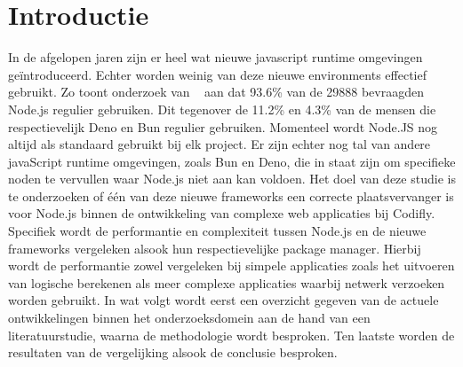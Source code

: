 
\section{Introductie}%
\label{sec:introductie}
In de afgelopen jaren zijn er heel wat nieuwe javascript runtime omgevingen geïntroduceerd. 
Echter worden weinig van deze nieuwe environments effectief gebruikt. 
Zo toont onderzoek van ~\textcite{Greif2022} aan dat 93.6\% van de 29888 bevraagden Node.js regulier gebruiken.
Dit tegenover de 11.2\% en 4.3\% van de mensen die respectievelijk Deno en Bun regulier gebruiken.
Momenteel wordt Node.JS nog altijd als standaard gebruikt bij elk project. 
Er zijn echter nog tal van andere javaScript runtime omgevingen, zoals Bun en Deno, 
die in staat zijn om specifieke noden te vervullen waar Node.js niet aan kan voldoen.
Het doel van deze studie is te onderzoeken of één van deze nieuwe frameworks een correcte plaatsvervanger is voor Node.js 
binnen de ontwikkeling van complexe web applicaties bij Codifly. 
Specifiek wordt de performantie en complexiteit tussen Node.js en de nieuwe frameworks vergeleken alsook 
hun respectievelijke package manager. 
Hierbij wordt de performantie zowel vergeleken bij simpele applicaties zoals het uitvoeren van logische berekenen
als meer complexe applicaties waarbij netwerk verzoeken worden gebruikt.
In wat volgt wordt eerst een overzicht gegeven van de actuele ontwikkelingen binnen het
onderzoeksdomein aan de hand van een literatuurstudie, waarna de methodologie wordt besproken.
Ten laatste worden de resultaten van de vergelijking alsook de conclusie besproken.




